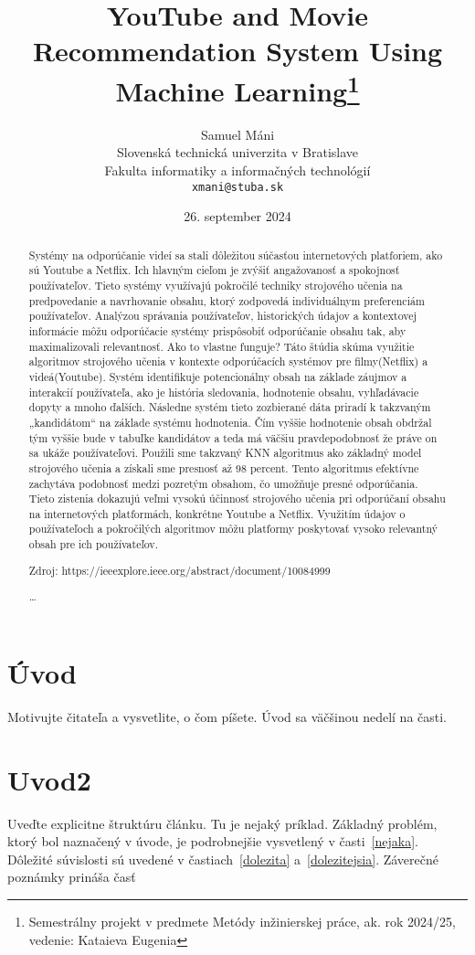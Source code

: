\documentclass[10pt,twoside,slovak,a4paper]{coursepaper}
\title{YouTube and Movie Recommendation System Using Machine Learning\thanks{Semestrálny projekt v predmete Metódy inžinierskej práce, ak. rok 2024/25, vedenie: Kataieva Eugenia
}} %
\author{Samuel Máni\\[2pt]
	{\small Slovenská technická univerzita v Bratislave}\\
	{\small Fakulta informatiky a informačných technológií}\\
	{\small \texttt{xmani@stuba.sk}}
	}
\date{\small 26. september 2024} %
\begin{document}
\maketitle
\begin{abstract}
	Systémy na odporúčanie videí sa stali dôležitou súčasťou internetových platforiem, ako sú Youtube a Netflix. Ich hlavným cieľom je zvýšiť angažovanosť a spokojnosť používateľov. Tieto systémy využívajú pokročilé techniky strojového učenia na predpovedanie a navrhovanie obsahu, ktorý zodpovedá individuálnym preferenciám používateľov. Analýzou správania používateľov, historických údajov a kontextovej informácie môžu odporúčacie systémy prispôsobiť odporúčanie obsahu tak, aby maximalizovali relevantnosť.
Ako to vlastne funguje? Táto štúdia skúma využitie algoritmov strojového učenia v kontexte odporúčacích systémov pre filmy(Netflix) a videá(Youtube). Systém identifikuje potencionálny obsah  na základe záujmov a interakcií používateľa, ako je história sledovania, hodnotenie obsahu, vyhľadávacie dopyty a mnoho ďalších. Následne systém tieto zozbierané dáta priradí k takzvaným „kandidátom“ na základe systému hodnotenia. Čím vyššie hodnotenie obsah obdržal tým vyššie bude v tabuľke kandidátov a teda má väčšiu pravdepodobnosť že práve on sa ukáže používateľovi. Použili sme takzvaný KNN algoritmus ako základný model strojového učenia a získali sme presnosť až 98 percent. Tento algoritmus efektívne zachytáva podobnosť medzi pozretým obsahom, čo umožňuje presné odporúčania.
Tieto zistenia dokazujú veľmi vysokú účinnosť strojového učenia pri odporúčaní obsahu na internetových platformách, konkrétne Youtube a Netflix. Využitím údajov o používateľoch a pokročilých algoritmov môžu platformy poskytovať vysoko relevantný obsah pre ich používateľov.

Zdroj: https://ieeexplore.ieee.org/abstract/document/10084999

\ldots
\end{abstract}



\section{Úvod}

Motivujte čitateľa a vysvetlite, o čom píšete. Úvod sa väčšinou nedelí na časti.

\section{Uvod2}
Uveďte explicitne štruktúru článku. Tu je nejaký príklad.
Základný problém, ktorý bol naznačený v úvode, je podrobnejšie vysvetlený v časti~\ref{nejaka}.
Dôležité súvislosti sú uvedené v častiach~\ref{dolezita} a~\ref{dolezitejsia}.
Záverečné poznámky prináša časť~
\end{document}
